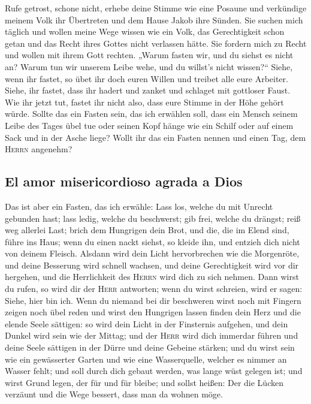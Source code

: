  Rufe getrost, schone nicht, erhebe deine Stimme wie eine
Posaune und verkündige meinem Volk ihr Übertreten und dem Hause Jakob
ihre Sünden.  Sie suchen mich täglich und wollen meine
Wege wissen wie ein Volk, das Gerechtigkeit schon getan und das Recht
ihres Gottes nicht verlassen hätte. Sie fordern mich zu Recht und wollen
mit ihrem Gott rechten.  „Warum fasten wir, und du siehst
es nicht an? Warum tun wir unserem Leibe wehe, und du willst's nicht
wissen?{}`` Siehe, wenn ihr fastet, so übet ihr doch euren Willen und
treibet alle eure Arbeiter.  Siehe, ihr fastet, dass ihr
hadert und zanket und schlaget mit gottloser Faust. Wie ihr jetzt tut,
fastet ihr nicht also, dass eure Stimme in der Höhe gehört würde.
 Sollte das ein Fasten sein, das ich erwählen soll, dass
ein Mensch seinem Leibe des Tages übel tue oder seinen Kopf hänge wie
ein Schilf oder auf einem Sack und in der Asche liege? Wollt ihr das ein
Fasten nennen und einen Tag, dem \textsc{Herrn} angenehm?

\hypertarget{el-amor-misericordioso-agrada-a-dios}{%
\subsection{El amor misericordioso agrada a
Dios}\label{el-amor-misericordioso-agrada-a-dios}}

 Das ist aber ein Fasten, das ich erwähle: Lass los,
welche du mit Unrecht gebunden hast; lass ledig, welche du beschwerst;
gib frei, welche du drängst; reiß weg allerlei Last; 
brich dem Hungrigen dein Brot, und die, die im Elend sind, führe ins
Haus; wenn du einen nackt siehst, so kleide ihn, und entzieh dich nicht
von deinem Fleisch.  Alsdann wird dein Licht hervorbrechen
wie die Morgenröte, und deine Besserung wird schnell wachsen, und deine
Gerechtigkeit wird vor dir hergehen, und die Herrlichkeit des
\textsc{Herrn} wird dich zu sich nehmen.  Dann wirst du
rufen, so wird dir der \textsc{Herr} antworten; wenn du wirst schreien,
wird er sagen: Siehe, hier bin ich. Wenn du niemand bei dir beschweren
wirst noch mit Fingern zeigen noch übel reden  und wirst
den Hungrigen lassen finden dein Herz und die elende Seele sättigen: so
wird dein Licht in der Finsternis aufgehen, und dein Dunkel wird sein
wie der Mittag;  und der \textsc{Herr} wird dich immerdar
führen und deine Seele sättigen in der Dürre und deine Gebeine stärken;
und du wirst sein wie ein gewässerter Garten und wie eine Wasserquelle,
welcher es nimmer an Wasser fehlt;  und soll durch dich
gebaut werden, was lange wüst gelegen ist; und wirst Grund legen, der
für und für bleibe; und sollst heißen: Der die Lücken verzäunt und die
Wege bessert, dass man da wohnen möge.

